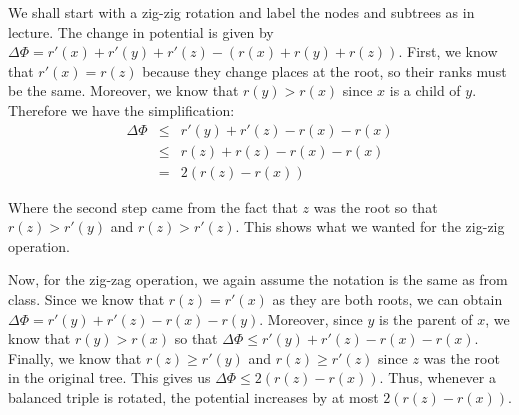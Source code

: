 \documentclass[psamsfonts]{amsart}
\newenvironment{sol}{\vspace{0.25cm}{\large \bfseries Solution:}}{\qedsymbol}
\begin{document}
\begin{sol}
We shall start with a zig-zig rotation and label the nodes and subtrees as in lecture. The change in potential is given by $\Delta \Phi = r'(x) + r'(y) +r'(z) - (r(x) + r(y) + r(z))$. First, we know that $r'(x) = r(z)$ because they change places at the root, so their ranks must be the same. Moreover, we know that $r(y) > r(x)$ since $x$ is a child of $y$. Therefore we have the simplification:
\begin{eqnarray}
\Delta \Phi &\leq& r'(y) + r'(z) - r(x) - r(x) \\
 &\leq& r(z) + r(z) - r(x) - r(x) \\
 &=& 2(r(z) - r(x))
\end{eqnarray}

Where the second step came from the fact that $z$ was the root so that $r(z) > r'(y)$ and $r(z) > r'(z)$. This shows what we wanted for the zig-zig operation. 

Now, for the zig-zag operation, we again assume the notation is the same as from class. Since we know that $r(z) = r'(x)$ as they are both roots, we can obtain $\Delta \Phi = r'(y) + r'(z) - r(x) - r(y)$. Moreover, since $y$ is the parent of $x$, we know that $r(y) > r(x)$ so that $\Delta \Phi \leq r'(y) + r'(z) - r(x) - r(x)$. Finally, we know that $r(z) \geq r'(y)$ and $r(z) \geq r'(z)$ since $z$ was the root in the original tree. This gives us $\Delta \Phi \leq 2(r(z) - r(x))$. Thus, whenever a balanced triple is rotated, the potential increases by at most $2(r(z) - r(x))$. 
\end{sol}
\end{document}
